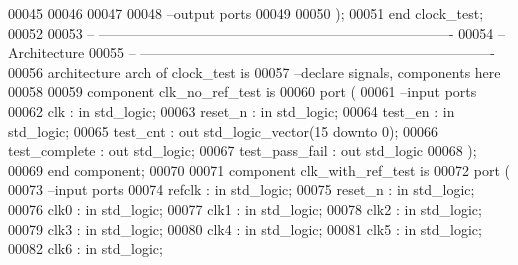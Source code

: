 \begin{DoxyCode}
00045           
00046           
00047 
00048 \textcolor{keyword}{        --output ports }
00049         
00050         \textcolor{vhdlchar}{)};
00051 \textcolor{keywordflow}{end} \textcolor{vhdlchar}{clock\_test};
00052 
00053 \textcolor{keyword}{-- ----------------------------------------------------------------------------}
00054 \textcolor{keyword}{-- Architecture}
00055 \textcolor{keyword}{-- ----------------------------------------------------------------------------}
00056 \textcolor{keywordflow}{architecture} arch \textcolor{keywordflow}{of} clock_test is
00057 \textcolor{keyword}{--declare signals,  components here}
00058 
00059 \textcolor{keywordflow}{component} clk_no_ref_test \textcolor{keywordflow}{is}
00060   \textcolor{keywordflow}{port} (
00061 \textcolor{keyword}{        --input ports }
00062         clk             : \textcolor{keywordflow}{in} \textcolor{comment}{std\_logic};
00063         reset_n         : \textcolor{keywordflow}{in} \textcolor{comment}{std\_logic};
00064           test_en           : \textcolor{keywordflow}{in} \textcolor{comment}{std\_logic};
00065           test_cnt          : \textcolor{keywordflow}{out} \textcolor{comment}{std\_logic\_vector}(\textcolor{vhdllogic}{}\textcolor{vhdllogic}{15} \textcolor{keywordflow}{downto} \textcolor{vhdllogic}{}\textcolor{vhdllogic}{0});
00066           test_complete : \textcolor{keywordflow}{out} \textcolor{comment}{std\_logic};
00067           test_pass_fail    : \textcolor{keywordflow}{out} \textcolor{comment}{std\_logic}    
00068         );
00069 \textcolor{keywordflow}{end} \textcolor{keywordflow}{component};
00070 
00071 \textcolor{keywordflow}{component} clk_with_ref_test \textcolor{keywordflow}{is}
00072   \textcolor{keywordflow}{port} (
00073 \textcolor{keyword}{        --input ports }
00074         refclk          : \textcolor{keywordflow}{in} \textcolor{comment}{std\_logic};
00075         reset_n         : \textcolor{keywordflow}{in} \textcolor{comment}{std\_logic};
00076           clk0              : \textcolor{keywordflow}{in} \textcolor{comment}{std\_logic};
00077           clk1              : \textcolor{keywordflow}{in} \textcolor{comment}{std\_logic};
00078           clk2              : \textcolor{keywordflow}{in} \textcolor{comment}{std\_logic};
00079           clk3              : \textcolor{keywordflow}{in} \textcolor{comment}{std\_logic};
00080           clk4              : \textcolor{keywordflow}{in} \textcolor{comment}{std\_logic};
00081           clk5              : \textcolor{keywordflow}{in} \textcolor{comment}{std\_logic};
00082           clk6              : \textcolor{keywordflow}{in} \textcolor{comment}{std\_logic};       

\end{DoxyCode}
